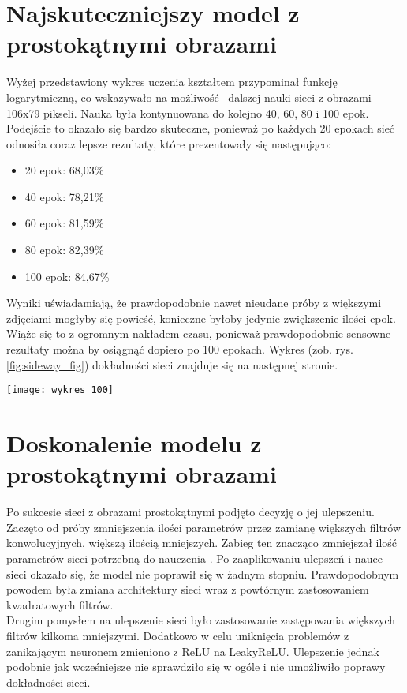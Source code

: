 \section{Najskuteczniejszy model z prostokątnymi obrazami}
Wyżej przedstawiony wykres uczenia kształtem przypominał funkcję logarytmiczną, co wskazywało na możliwość 
dalszej nauki sieci z obrazami 106x79 pikseli. Nauka była kontynuowana do kolejno 40, 60, 80 i 100 epok.\\
Podejście to okazało się bardzo skuteczne, ponieważ po każdych 20 epokach
sieć odnosiła coraz lepsze rezultaty, które prezentowały się następująco:\\
\begin{itemize}
\item  20 epok: 68,03\%\\
\item  40 epok: 78,21\%\\
\item  60 epok: 81,59\%\\
\item  80 epok: 82,39\%\\
\item  100 epok: 84,67\%\\
\end{itemize}
Wyniki uświadamiają, że prawdopodobnie nawet nieudane próby z większymi zdjęciami
mogłyby się powieść, konieczne byłoby jedynie zwiększenie ilości epok. Wiąże się to
z ogromnym nakładem czasu, ponieważ prawdopodobnie sensowne rezultaty można by osiągnąć
dopiero po 100 epokach. Wykres (zob. rys. \ref{fig:sideway_fig}) dokładności sieci znajduje się na następnej stronie.

\begin{sidewaysfigure}
\texttt{[image: wykres\_100]}
\caption{Wykres uczenia przez 100 epok}
\label{fig:sideway_fig}
\end{sidewaysfigure}

\section{Doskonalenie modelu z prostokątnymi obrazami}
Po sukcesie sieci z obrazami prostokątnymi podjęto decyzję o jej ulepszeniu.
Zaczęto od próby zmniejszenia ilości parametrów przez zamianę większych filtrów konwolucyjnych,
większą ilością mniejszych. Zabieg ten znacząco zmniejszał ilość parametrów sieci potrzebną do nauczenia \cite{substBigConv}.
Po zaaplikowaniu ulepszeń i nauce sieci okazało się, że model nie poprawił się w żadnym
stopniu. Prawdopodobnym powodem była zmiana architektury sieci wraz z powtórnym
zastosowaniem kwadratowych filtrów.\\
Drugim pomysłem na ulepszenie sieci było zastosowanie zastępowania większych filtrów
kilkoma mniejszymi. Dodatkowo w celu uniknięcia problemów z zanikającym neuronem zmieniono z ReLU na LeakyReLU.
Ulepszenie jednak podobnie jak wcześniejsze nie sprawdziło się w ogóle i nie umożliwiło poprawy dokładności sieci.
